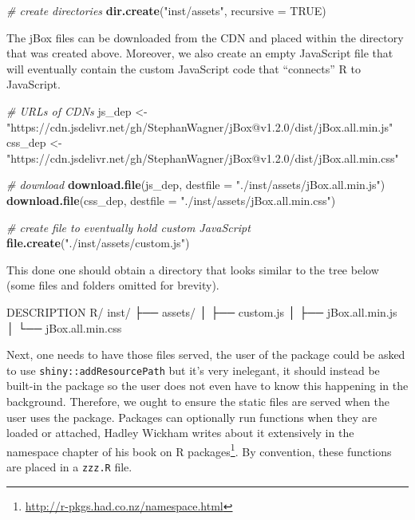 \documentclass[
]{krantz}
\makeatletter
\newenvironment{Shaded}{\begin{snugshade}}{\end{snugshade}}
\newcommand{\CommentTok}[1]{\textcolor[rgb]{0.37,0.37,0.37}{\textit{#1}}}
\newcommand{\DataTypeTok}[1]{\textcolor[rgb]{0.27,0.27,0.27}{#1}}
\newcommand{\ExtensionTok}[1]{#1}
\newcommand{\KeywordTok}[1]{\textcolor[rgb]{0.27,0.27,0.27}{\textbf{#1}}}
\newcommand{\NormalTok}[1]{#1}
\newcommand{\OtherTok}[1]{\textcolor[rgb]{0.37,0.37,0.37}{#1}}
\newcommand{\StringTok}[1]{\textcolor[rgb]{0.5,0.5,0.5}{#1}}
\renewcommand{\href}[2]{#2\footnote{\url{#1}}}
\newenvironment{kframe}{%
\medskip{}
\setlength{\fboxsep}{.8em}
 \def\at@end@of@kframe{}%
 \ifinner\ifhmode%
  \def\at@end@of@kframe{\end{minipage}}%
  \begin{minipage}{\columnwidth}%
 \fi\fi%
 \def\FrameCommand##1{\hskip\@totalleftmargin \hskip-\fboxsep
 \colorbox{shadecolor}{##1}\hskip-\fboxsep
     \hskip-\linewidth \hskip-\@totalleftmargin \hskip\columnwidth}%
 \MakeFramed {\advance\hsize-\width
   \@totalleftmargin\z@ \linewidth\hsize
   \@setminipage}}%
 {\par\unskip\endMakeFramed%
 \at@end@of@kframe}
\renewenvironment{Shaded}{\begin{kframe}}{\end{kframe}}
\makeatother
\begin{document}
\begin{Shaded}
\begin{Highlighting}[]
\CommentTok{\# create directories}
\KeywordTok{dir.create}\NormalTok{(}\StringTok{"inst/assets"}\NormalTok{, }\DataTypeTok{recursive =} \OtherTok{TRUE}\NormalTok{)}
\end{Highlighting}
\end{Shaded}

The jBox files can be downloaded from the CDN and placed within the directory that was created above. Moreover, we also create an empty JavaScript file that will eventually contain the custom JavaScript code that ``connects'' R to JavaScript.

\begin{Shaded}
\begin{Highlighting}[]
\CommentTok{\# URLs of CDNs}
\NormalTok{js\_dep <{-}}\StringTok{ "https://cdn.jsdelivr.net/gh/StephanWagner/jBox@v1.2.0/dist/jBox.all.min.js"}
\NormalTok{css\_dep <{-}}\StringTok{ "https://cdn.jsdelivr.net/gh/StephanWagner/jBox@v1.2.0/dist/jBox.all.min.css"}

\CommentTok{\# download}
\KeywordTok{download.file}\NormalTok{(js\_dep, }\DataTypeTok{destfile =} \StringTok{"./inst/assets/jBox.all.min.js"}\NormalTok{)}
\KeywordTok{download.file}\NormalTok{(css\_dep, }\DataTypeTok{destfile =} \StringTok{"./inst/assets/jBox.all.min.css"}\NormalTok{)}

\CommentTok{\# create file to eventually hold custom JavaScript}
\KeywordTok{file.create}\NormalTok{(}\StringTok{"./inst/assets/custom.js"}\NormalTok{)}
\end{Highlighting}
\end{Shaded}

This done one should obtain a directory that looks similar to the tree below (some files and folders omitted for brevity).

\begin{Shaded}
\begin{Highlighting}[]
\ExtensionTok{DESCRIPTION}
\ExtensionTok{R/}
\ExtensionTok{inst/}
\NormalTok{├── }\ExtensionTok{assets/}
\NormalTok{│    ├── }\ExtensionTok{custom.js}
\NormalTok{│    ├── }\ExtensionTok{jBox.all.min.js}
\NormalTok{│    └── }\ExtensionTok{jBox.all.min.css}
\end{Highlighting}
\end{Shaded}

Next, one needs to have those files served, the user of the package could be asked to use \texttt{shiny::addResourcePath} but it's very inelegant, it should instead be built-in the package so the user does not even have to know this happening in the background. Therefore, we ought to ensure the static files are served when the user uses the package. Packages can optionally run functions when they are loaded or attached, Hadley Wickham writes about it extensively in the namespace chapter of his book on \href{http://r-pkgs.had.co.nz/namespace.html}{R packages}. By convention, these functions are placed in a \texttt{zzz.R} file.
\end{document}
